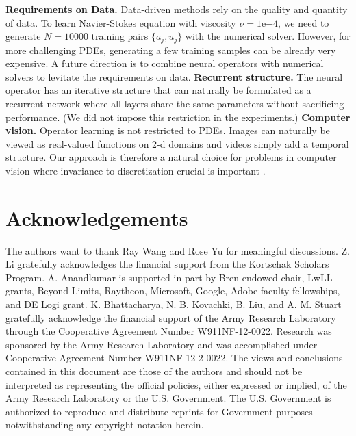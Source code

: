 \documentclass{article} %
\begin{document}
\textbf{Requirements on Data.} Data-driven methods rely on the quality and quantity of data. To learn Navier-Stokes equation with viscosity $\nu=1\mathrm{e}{-4}$, we need to generate $N=10000$ training pairs $\{a_j,u_j\}$ with the numerical solver. However, for more challenging PDEs, generating a few training samples can be already very expensive. A future direction is to combine neural operators with numerical solvers to levitate the requirements on data.
\textbf{Recurrent structure.} The neural operator has an iterative structure that can naturally be formulated as a recurrent network where all layers share the same parameters without sacrificing performance. (We did not impose this restriction in the experiments.)
\textbf{Computer vision.} Operator learning is not restricted to PDEs. Images can naturally be viewed as real-valued functions on 2-d domains and videos simply add a temporal structure.
Our approach is therefore a natural choice for problems in computer vision where invariance to discretization crucial is important \citep{chi2020fast}. 
   

\section*{Acknowledgements}
The authors want to thank Ray Wang and Rose Yu for meaningful discussions.
Z. Li gratefully acknowledges the financial support from the Kortschak Scholars Program.
A. Anandkumar is supported in part by Bren endowed chair, LwLL grants, Beyond Limits, Raytheon, Microsoft, Google, Adobe faculty fellowships, and DE Logi grant. 
K. Bhattacharya, N. B. Kovachki, B. Liu, and A. M. Stuart gratefully acknowledge the financial support of the Army Research Laboratory through the Cooperative Agreement Number W911NF-12-0022. Research was sponsored by the Army Research Laboratory and was accomplished under Cooperative Agreement Number W911NF-12-2-0022. 
The views and conclusions contained in this document are those of the authors and should not be interpreted as representing the official policies, either expressed or implied, of the Army Research Laboratory or the U.S. Government. The U.S. Government is authorized to reproduce and distribute reprints for Government purposes notwithstanding any copyright notation herein. 
\end{document}
